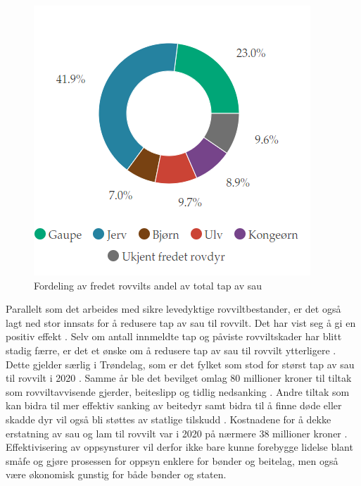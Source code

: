 \begin{figure}[H] 
\centering
\captionsetup{width=.8\linewidth}
\includegraphics[]{Figurer/diagram/andel_rovvilt_diagram.png}
\caption{Fordeling av fredet rovvilts andel av total tap av sau}
\label{fig:rovdyr_andel}
\end{figure}

\noindent
Parallelt som det arbeides med sikre levedyktige rovviltbestander, er det også lagt ned stor innsats for å redusere tap av sau til rovvilt. Det har vist seg å gi en positiv effekt \cite{Klima-ogmiljdepartementet2020RekordlaveRovvilt}. Selv om antall innmeldte tap og påviste rovviltskader har blitt stadig færre, er det et ønske om å redusere tap av sau til rovvilt ytterligere \cite{Miljdirektoratet2020RekordlavtSau}. Dette gjelder særlig i Trøndelag, som er det fylket som stod for størst tap av sau til rovvilt i 2020 \cite{Miljdirektoratet2021Rovvilt2020}. Samme år ble det bevilget omlag 80 millioner kroner til tiltak som rovviltavvisende gjerder, beiteslipp og tidlig nedsanking \cite{Klima-ogmiljdepartementet2020RekordlaveRovvilt}. Andre tiltak som kan bidra til mer effektiv sanking av beitedyr samt bidra til å finne døde eller skadde dyr vil også bli støttes av statlige tilskudd \cite{Klima-ogmiljdepartementet2020RekordlaveRovvilt}. Kostnadene for å dekke erstatning av sau og lam til rovvilt var i 2020 på nærmere 38 millioner kroner \cite{Miljdirektoratet2021Rovvilt2020}. Effektivisering av oppsynsturer vil derfor ikke bare kunne forebygge lidelse blant småfe og gjøre prosessen for oppsyn enklere for bønder og beitelag, men også være økonomisk gunstig for både bønder og staten. 

